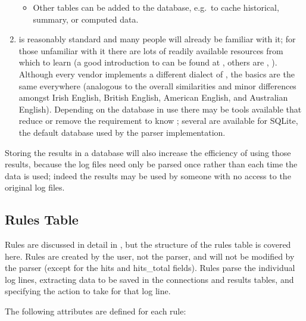 \begin{enumerate}
\begin{itemize}
            \item Other tables can be added to the database, e.g.\ to cache
                historical, summary, or computed data.

        \end{itemize}


    \item {} is reasonably standard and many people will already
        be familiar with it; for those unfamiliar with it there are lots of
        readily available resources from which to learn (a good
        introduction to  can be found at
        ,
        others are
        ,
        ).  Although
        every vendor implements a different dialect of , the
        basics are the same everywhere (analogous to the overall
        similarities and minor differences amongst Irish English, British
        English, American English, and Australian English).  Depending on
        the database in use there may be tools available that reduce or
        remove the requirement to know ; several are available
        for \gls{SQLite}, the default database used by the parser
        implementation.

\end{enumerate}

Storing the results in a database will also increase the efficiency of
using those results, because the log files need only be parsed once rather
than each time the data is used; indeed the results may be used by someone
with no access to the original log files.

\subsection{Rules Table}

\label{rule attributes}

Rules are discussed in detail in , but
the structure of the rules table is covered here.  Rules are created by the
user, not the parser, and will not be modified by the parser (except for
the hits and hits\_total fields).  Rules parse the individual log lines,
extracting data to be saved in the connections and results tables, and
specifying the action to take for that log line.

The following attributes are defined for each rule:

